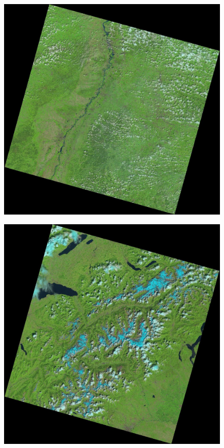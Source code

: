 \documentclass{book}
\begin{document}
\begin{figure}[H]
\begin{center}
\includegraphics[scale=0.18]{images/LC81950262013156LGN00.jpg}
\end{center}
\label{cloud4}
\end{figure}

\begin{figure}[H]
\begin{center}
\includegraphics[scale=0.18]{images/LC81950282013204LGN00.jpg}
\end{center}
\label{cloud5}
\end{figure}
\end{document}
